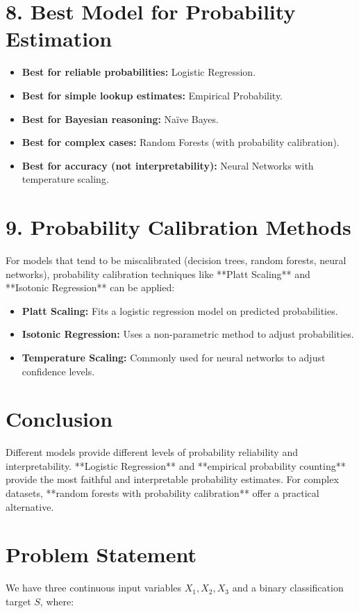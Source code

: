 \documentclass{article}
\begin{document}
\section{8. Best Model for Probability Estimation}
\begin{itemize}
    \item \textbf{Best for reliable probabilities:} Logistic Regression.
    \item \textbf{Best for simple lookup estimates:} Empirical Probability.
    \item \textbf{Best for Bayesian reasoning:} Naïve Bayes.
    \item \textbf{Best for complex cases:} Random Forests (with probability calibration).
    \item \textbf{Best for accuracy (not interpretability):} Neural Networks with temperature scaling.
\end{itemize}

\section{9. Probability Calibration Methods}
For models that tend to be miscalibrated (decision trees, random forests, neural networks), probability calibration techniques like **Platt Scaling** and **Isotonic Regression** can be applied:

\begin{itemize}
    \item \textbf{Platt Scaling:} Fits a logistic regression model on predicted probabilities.
    \item \textbf{Isotonic Regression:} Uses a non-parametric method to adjust probabilities.
    \item \textbf{Temperature Scaling:} Commonly used for neural networks to adjust confidence levels.
\end{itemize}

\section{Conclusion}
Different models provide different levels of probability reliability and interpretability. **Logistic Regression** and **empirical probability counting** provide the most faithful and interpretable probability estimates. For complex datasets, **random forests with probability calibration** offer a practical alternative.




\section{Problem Statement}
We have three continuous input variables \( X_1, X_2, X_3 \) and a binary classification target \( S \), where:
\end{document}

